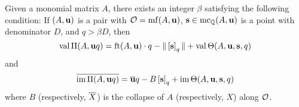 \documentclass[11pt]{amsart}
\begin{document}
%
%
%


\begin{corollary}  
\label{uniform value and image: C}
Given a monomial matrix $A$, there exists an integer $\beta$ satisfying the following condition\textup:  If $(A, \mathbf{u})$ is a pair with $\mathcal{O} = \operatorname{mf}(A, \mathbf{u})$, $\mathbf{s} \in \operatorname{mc}_{\mathbb{Q}}(A, \mathbf{u})$ is a point with denominator $D$, and $q>\beta D$, then 
%
\[ \operatorname{val} \Pi(A, \mathbf{u}q) = \operatorname{ft}(A, \mathbf{u}) \cdot q - \| \left[ \mathbf{s} \right]_q \| + \operatorname{val} \Theta(A, \mathbf{u}, \mathbf{s}, q) \] 
%
and 
\[ \overline{\operatorname{im} \Pi(A, \mathbf{u}q)} = \overline{\mathbf{u}} q - B \left[ \mathbf{s} \right]_q + \operatorname{im} \Theta(A, \mathbf{u}, \mathbf{s}, q) \] 
where $B$ (respectively, $\overline{X}$) is the collapse of $A$  (respectively, $X$) along $\mathcal{O}$.
\end{corollary}
\end{document}
